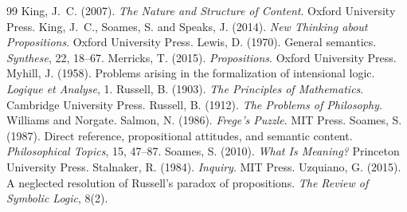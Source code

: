 \documentclass{situationist-preprint}
\begin{document}
\begin{thebibliography}{99}
 King, J.~C. (2007). \emph{The Nature and Structure of Content}. Oxford University Press.
 King, J.~C., Soames, S. and Speaks, J. (2014). \emph{New Thinking about Propositions}. Oxford University Press.
 Lewis, D. (1970). General semantics. \emph{Synthese}, 22, 18--67.
 Merricks, T. (2015). \emph{Propositions}. Oxford University Press.
 Myhill, J. (1958). Problems arising in the formalization of intensional logic. \emph{Logique et Analyse}, 1.
 Russell, B. (1903). \emph{The Principles of Mathematics}. Cambridge University Press.
 Russell, B. (1912). \emph{The Problems of Philosophy}. Williams and Norgate.
 Salmon, N. (1986). \emph{Frege's Puzzle}. MIT Press.
 Soames, S. (1987). Direct reference, propositional attitudes, and semantic content. \emph{Philosophical Topics}, 15, 47--87.
 Soames, S. (2010). \emph{What Is Meaning?} Princeton University Press.
 Stalnaker, R. (1984). \emph{Inquiry}. MIT Press.
 Uzquiano, G. (2015). A neglected resolution of Russell's paradox of propositions. \emph{The Review of Symbolic Logic}, 8(2).
\end{thebibliography}
\end{document}
